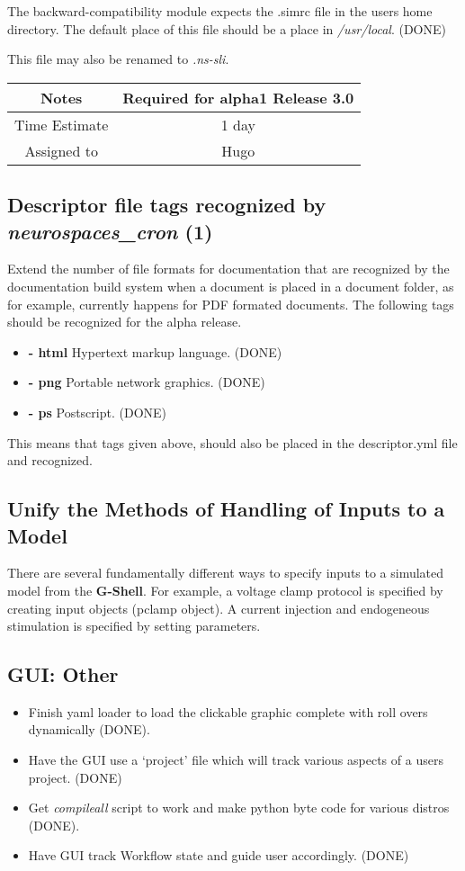 \documentclass[12pt]{article}
\begin{document}
The backward-compatibility module expects the .simrc file in the users
home directory.  The default place of this file should be a place in
{\it /usr/local}. (DONE)

This file may also be renamed to {\it .ns-sli}.

{
  \vspace{5mm}
  \centering
  \begin{tabular}{|c|c|}
    \hline
    Notes
    & Required for alpha1 Release 3.0 \\
    \hline
    Time Estimate
    & 1 day \\
    \hline
    Assigned to
    & Hugo \\
    \hline
  \end{tabular}
}


\subsection{Descriptor file tags recognized by {\it neurospaces\_cron} (1)}

Extend the number of file formats for documentation that are
recognized by the documentation build system when a document is placed
in a document folder, as for example, currently happens for PDF
formated documents. The following tags should be recognized for the
alpha release.
\begin{itemize}
   \item[]{\bf - html} Hypertext markup language. (DONE)
    \item[]{\bf - png} Portable network graphics. (DONE)
    \item[]{\bf - ps} Postscript. (DONE)
\end{itemize}
This means that tags given above, should also be placed in the
descriptor.yml file and recognized.

\subsection{Unify the Methods of Handling of Inputs to a Model}

There are several fundamentally different ways to specify inputs to a
simulated model from the {\bf G-Shell}.  For example, a voltage clamp
protocol is specified by creating input objects (pclamp object).  A
current injection and endogeneous stimulation is specified by setting
parameters.


\subsection{GUI: Other}
\begin{itemize}
\item Finish yaml loader to load the clickable graphic complete with
  roll overs dynamically (DONE).
\item Have the GUI use a `project' file which will track various
  aspects of a users project. (DONE)
\item Get {\it compileall} script to work and make python byte code for
  various distros (DONE).
\item Have GUI track Workflow state and guide user accordingly. (DONE)
\end{itemize}
\end{document}
